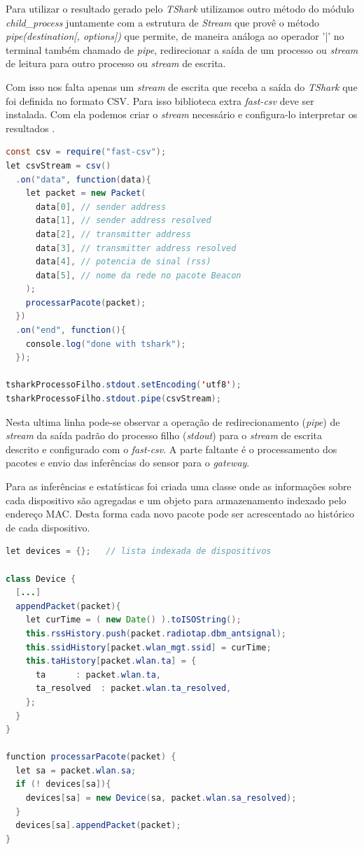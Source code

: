 Para utilizar o resultado gerado pelo \emph{TShark} utilizamos outro método do
módulo \emph{child\_process} juntamente com a estrutura de \emph{Stream}
\cite{stream} que provê o método \emph{pipe(destination[, options])} que permite,
de maneira análoga ao operador '|' no terminal também chamado de \emph{pipe},
redirecionar a saída de um processo ou \emph{stream} de leitura para outro
processo ou \emph{stream} de escrita.

Com isso nos falta apenas um \emph{stream} de escrita que receba a saída do
\emph{TShark} que foi definida no formato CSV. Para isso biblioteca extra
\emph{fast-csv} deve ser instalada. Com ela podemos criar o \emph{stream}
necessário e configura-lo interpretar os resultados \cite{fast-csv}.

\begin{lstlisting}[language=java]
const csv = require("fast-csv");
let csvStream = csv()
  .on("data", function(data){
    let packet = new Packet(
      data[0], // sender address
      data[1], // sender address resolved
      data[2], // transmitter address
      data[3], // transmitter address resolved
      data[4], // potencia de sinal (rss)
      data[5], // nome da rede no pacote Beacon
    );
    processarPacote(packet);
  })
  .on("end", function(){
    console.log("done with tshark");
  });

tsharkProcessoFilho.stdout.setEncoding('utf8');
tsharkProcessoFilho.stdout.pipe(csvStream);
\end{lstlisting}

Nesta ultima linha pode-se observar a operação de redirecionamento (\emph{pipe})
de \emph{stream} da saída padrão do processo filho (\emph{stdout}) para o
\emph{stream} de escrita descrito e configurado com o \emph{fast-csv}. A parte
faltante é o processamento dos pacotes e envio das inferências do sensor para o
\emph{gateway}.

Para as inferências e estatísticas foi criada uma classe onde as informações
sobre cada dispositivo são agregadas e um objeto para armazenamento indexado
pelo endereço MAC. Desta forma cada novo pacote pode ser acrescentado ao
histórico de cada dispositivo.

\begin{lstlisting}[language=java]
let devices = {};	// lista indexada de dispositivos

class Device {
  [...]
  appendPacket(packet){
    let curTime = ( new Date() ).toISOString();
    this.rssHistory.push(packet.radiotap.dbm_antsignal);
    this.ssidHistory[packet.wlan_mgt.ssid] = curTime;
    this.taHistory[packet.wlan.ta] = {
      ta      : packet.wlan.ta,
      ta_resolved  : packet.wlan.ta_resolved,
    };
  }
}

function processarPacote(packet) {
  let sa = packet.wlan.sa;
  if (! devices[sa]){
    devices[sa] = new Device(sa, packet.wlan.sa_resolved);
  }
  devices[sa].appendPacket(packet);
}
\end{lstlisting}

